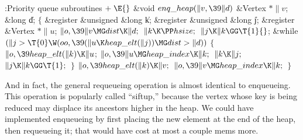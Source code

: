 \Y\B\4:Priority queue subroutines\X${}\mathrel+\E{}$\6
\1\1\&{void} ${}\\{enq\_heap}(\|v,\39\|d){}$\6
\&{Vertex} ${}{*}\|v{}$;\6
\&{long} \|d;\2\2\6
${}\{{}$\5
\1\&{register} \&{unsigned} \&{long} \|k;\6
\&{register} \&{unsigned} \&{long} \|j;\6
\&{register} \&{Vertex} ${}{*}\|u{}$;\7
${}\|o,\39\|v\MG\\{dist}\K\|d;{}$\6
${}\|k\K\PP\\{hsize};{}$\6
${}\|j\K\|k\GG\T{1}{}$;\6
\&{while} ${}(\|j>\T{0}\W(\\{oo},\39(\|u\K\\{heap\_elt}(\|j))\MG\\{dist}>%
\|d)){}$\5
${}\{{}$\1\6
${}\|o,\39\\{heap\_elt}(\|k)\K\|u{}$;\6
${}\|o,\39\|u\MG\\{heap\_index}\K\|k;{}$\6
${}\|k\K\|j;{}$\6
${}\|j\K\|k\GG\T{1};{}$\6
\4${}\}{}$\2\6
${}\|o,\39\\{heap\_elt}(\|k)\K\|v;{}$\6
${}\|o,\39\|v\MG\\{heap\_index}\K\|k;{}$\6
\4${}\}{}$\2\par
\fi

And in fact, the general requeueing operation is almost identical to
enqueueing.  This operation is popularly called ``siftup,'' because
the vertex whose key is being reduced may displace its ancestors
higher in the heap. We could have implemented enqueueing by first
placing the new element at the end of the heap, then requeueing it;
that would have cost at most a couple mems more.

